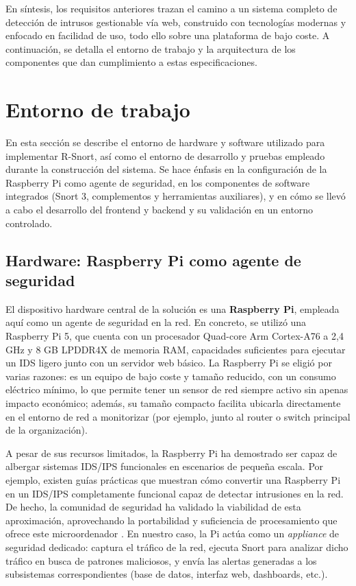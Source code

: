 \documentclass[11pt,a4paper,twoside]{report}
\begin{document}
En síntesis, los requisitos anteriores trazan el camino a un sistema completo de detección de intrusos gestionable vía web, construido con tecnologías modernas y enfocado en facilidad de uso, todo ello sobre una plataforma de bajo coste. A continuación, se detalla el entorno de trabajo y la arquitectura de los componentes que dan cumplimiento a estas especificaciones.\newline

\section{Entorno de trabajo}
En esta sección se describe el entorno de hardware y software utilizado para implementar R-Snort, así como el entorno de desarrollo y pruebas empleado durante la construcción del sistema. Se hace énfasis en la configuración de la Raspberry Pi como agente de seguridad, en los componentes de software integrados (Snort 3, complementos y herramientas auxiliares), y en cómo se llevó a cabo el desarrollo del frontend y backend y su validación en un entorno controlado.\newline

\subsection{Hardware: Raspberry Pi como agente de seguridad}
El dispositivo hardware central de la solución es una \textbf{Raspberry Pi}, empleada aquí como un agente de seguridad en la red. En concreto, se utilizó una Raspberry Pi 5, que cuenta con un procesador Quad-core Arm Cortex-A76 a 2,4 GHz y 8 GB LPDDR4X de memoria RAM, capacidades suficientes para ejecutar un IDS ligero junto con un servidor web básico. La Raspberry Pi se eligió por varias razones: es un equipo de bajo coste y tamaño reducido, con un consumo eléctrico mínimo, lo que permite tener un sensor de red siempre activo sin apenas impacto económico; además, su tamaño compacto facilita ubicarla directamente en el entorno de red a monitorizar (por ejemplo, junto al router o switch principal de la organización).\newline

A pesar de sus recursos limitados, la Raspberry Pi ha demostrado ser capaz de albergar sistemas IDS/IPS funcionales en escenarios de pequeña escala. Por ejemplo, existen guías prácticas que muestran cómo convertir una Raspberry Pi en un IDS/IPS completamente funcional capaz de detectar intrusiones en la red. De hecho, la comunidad de seguridad ha validado la viabilidad de esta aproximación, aprovechando la portabilidad y suficiencia de procesamiento que ofrece este microordenador \cite{SecMaster2024}. En nuestro caso, la Pi actúa como un \emph{appliance} de seguridad dedicado: captura el tráfico de la red, ejecuta Snort para analizar dicho tráfico en busca de patrones maliciosos, y envía las alertas generadas a los subsistemas correspondientes (base de datos, interfaz web, dashboards, etc.).\newline
\end{document}
